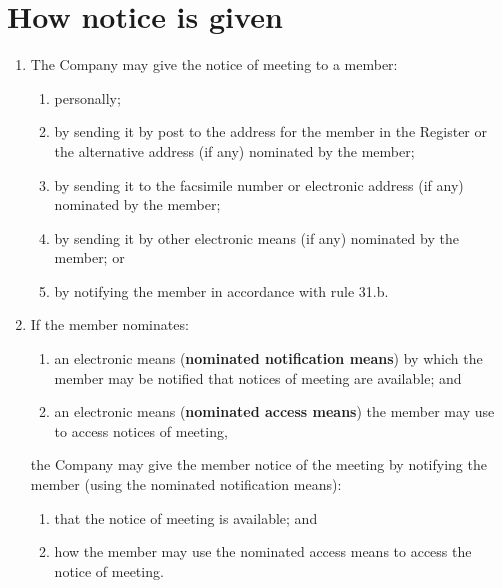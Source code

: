 \section{How notice is given}

\begin{enumerate}[label=(\alph*)]
    \item The Company may give the notice of meeting to a member:
    \begin{enumerate}[label=(\roman*)]
        \item personally;
        \item by sending it by post to the address for the member in the Register or the alternative address (if any) nominated by the member;
        \item by sending it to the facsimile number or electronic address (if any) nominated by the member;
        \item by sending it by other electronic means (if any) nominated by the member; or
        \item by notifying the member in accordance with rule 31.b.
    \end{enumerate}
    
    \item If the member nominates:
    \begin{enumerate}[label=(\roman*)]
        \item an electronic means (\textbf{nominated notification means}) by which the member may be notified that notices of meeting are available; and
        \item an electronic means (\textbf{nominated access means}) the member may use to access notices of meeting,
    \end{enumerate}
    
    the Company may give the member notice of the meeting by notifying the member (using the nominated notification means):
    \begin{enumerate}[label=(\roman*)]
        \item that the notice of meeting is available; and
        \item how the member may use the nominated access means to access the notice of meeting.
    \end{enumerate}
\end{enumerate} 